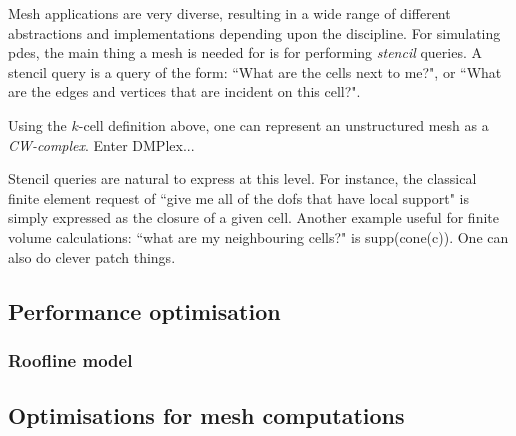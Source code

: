 

Mesh applications are very diverse, resulting in a wide range of different abstractions and implementations depending upon the discipline.
For simulating \gls{pde}s, the main thing a mesh is needed for is for performing \textit{stencil} queries.
A stencil query is a query of the form: ``What are the cells next to me?", or ``What are the edges and vertices that are incident on this cell?".

Using the $k$-cell definition above, one can represent an unstructured mesh as a \textit{CW-complex}.
Enter DMPlex...



Stencil queries are natural to express at this level.
For instance, the classical finite element request of ``give me all of the \glspl{dof} that have local support" is simply expressed as the closure of a given cell.
Another example useful for finite volume calculations: ``what are my neighbouring cells?" is supp(cone(c)).
One can also do clever patch things.


\subsection{Performance optimisation}

\subsubsection{Roofline model}

\begin{figure}
  
\end{figure}

\subsection{Optimisations for mesh computations}
